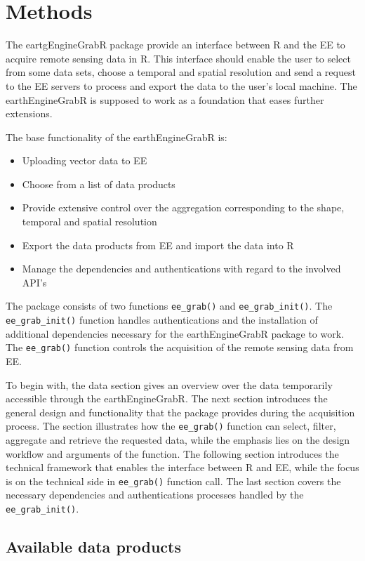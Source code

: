 \chapter{Methods}

The eartgEngineGrabR package provide an interface between R and the EE to acquire remote sensing data in R. This interface should enable the user to select from some data sets, choose a temporal and spatial resolution and send a request to the EE servers to process and export the data to the user's local machine. The earthEngineGrabR is supposed to work as a foundation that eases further extensions.

The base functionality of the earthEngineGrabR is: 
\begin{itemize}
	\item Uploading vector data to EE
	\item Choose from a list of data products
	\item Provide extensive control over the aggregation corresponding to the shape, temporal and spatial resolution
	\item Export the data products from EE and import the data into R
	\item Manage the dependencies and authentications with regard to the involved API's
\end{itemize}

The package consists of two functions \mbox{\texttt{ee\_grab()}} and \mbox{\texttt{ee\_grab\_init()}}. The \texttt{ee\_grab\_init()} function handles authentications and the installation of additional dependencies necessary for the earthEngineGrabR package to work. The \texttt{ee\_grab()} function controls the acquisition of the remote sensing data from EE.

To begin with, the data section gives an overview over the data temporarily accessible through the earthEngineGrabR. 
The next section introduces the general design and functionality that the package provides during the acquisition process. The section illustrates how the \texttt{ee\_grab()} function can select, filter, aggregate and retrieve the requested data, while the emphasis lies on the design workflow and arguments of the function.
The following section introduces the technical framework that enables the interface between R and EE, while the focus is on the technical side in \texttt{ee\_grab()} function call.
The last section covers the necessary dependencies and authentications processes handled by the \texttt{ee\_grab\_init()}.

\section{Available data products}

